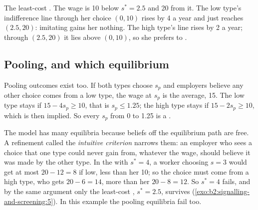 \begin{omfigure}

{\small The least-cost . The wage is 10 below $s^* = 2.5$ and 20 from it. The low type's indifference
line through her choice $(0, 10)$ rises by 4 a year and just reaches $(2.5, 20)$: imitating gains her nothing. The high type's
line rises by 2 a year; through $(2.5, 20)$ it lies above $(0, 10)$, so she prefers to .}
\end{omfigure}

\subsection{Pooling, and which equilibrium}

Pooling outcomes exist too. If both types choose $s_p$ and employers believe any other choice comes from a low type, the
wage at $s_p$ is the average, 15. The low type stays if $15 - 4s_p \ge 10$, that is $s_p \le 1.25$; the high type stays if $15 - 2s_p \ge 10$,
which is then implied. So every $s_p$ from 0 to 1.25 is a .

The model has many equilibria because beliefs off the equilibrium path are free. A refinement called the
\emph{intuitive criterion} narrows them: an employer who sees a choice that one type could never gain from, whatever the
wage, should believe it was made by the other type. In the  with $s^* = 4$, a worker choosing $s = 3$
would get at most $20 - 12 = 8$ if low, less than her 10; so the choice must come from a high type, who gets $20 - 6 = 14$, more
than her $20 - 8 = 12$. So $s^* = 4$ fails, and by the same argument only the least-cost , $s^* = 2.5$,
survives (\cref{exo:b2:signalling-and-screening:5}). In this example the pooling equilibria fail too.

